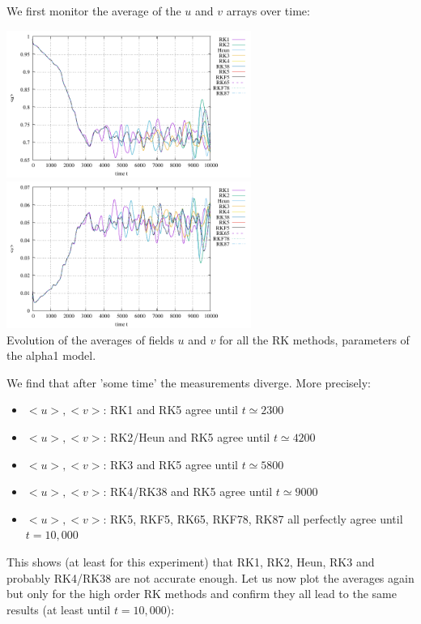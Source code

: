 We first monitor the average of the $u$ and $v$ arrays over time:
\begin{center}
\includegraphics[width=8cm]{python_codes/fieldstone_171/RKtest2/avrg_u.pdf}
\includegraphics[width=8cm]{python_codes/fieldstone_171/RKtest2/avrg_v.pdf}\\
{\captionfont Evolution of the averages of fields $u$
and $v$ for all the RK methods, parameters of the alpha1 model.}
\end{center}
We find that after 'some time'  the measurements diverge. 
More precisely:
\begin{itemize}
\item $<u>,<v>$: RK1      and RK5 agree until $t\simeq 2300$
\item $<u>,<v>$: RK2/Heun and RK5 agree until $t\simeq 4200$
\item $<u>,<v>$: RK3      and RK5 agree until $t\simeq 5800$
\item $<u>,<v>$: RK4/RK38 and RK5 agree until $t\simeq 9000$
\item $<u>,<v>$: RK5, RKF5, RK65, RKF78, RK87 all perfectly agree until $t=10,000$
\end{itemize}


This shows (at least for this experiment) that RK1, RK2, Heun, RK3 and probably RK4/RK38
are not accurate enough. Let us now plot the averages again but only for the high
order RK methods and confirm they all lead to the same results (at least until $t=10,000$):

